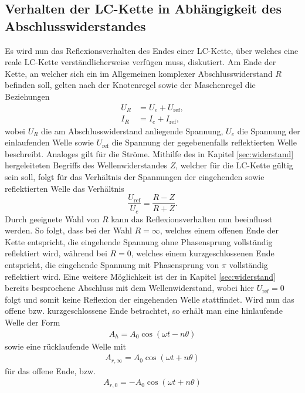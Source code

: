 \subsection{Verhalten der LC-Kette in Abhängigkeit des Abschlusswiderstandes}
\label{sec:verhalten}
Es wird nun das Reflexionsverhalten des Endes einer LC-Kette, über welches eine reale LC-Kette verständlicherweise verfügen muss, diskutiert.
Am Ende der Kette, an welcher sich ein im Allgemeinen komplexer Abschlusswiderstand $R$ befinden soll, gelten nach der Knotenregel sowie der Maschenregel die Beziehungen
\begin{align}
  U_R &= U_e + U_{\text{ref}}, \\
  I_R &= I_e + I_{\text{ref}},
\end{align}
wobei $U_R$ die am Abschlusswiderstand anliegende Spannung, $U_e$ die Spannung der einlaufenden Welle sowie $U_{\text{ref}}$ die Spannung der gegebenenfalls reflektierten Welle beschreibt.
Analoges gilt für die Ströme.
Mithilfe des in Kapitel \ref{sec:widerstand} hergeleiteten Begriffs des Wellenwiderstandes $Z$, welcher für die LC-Kette gültig sein soll, folgt für das Verhältnis der Spannungen der eingehenden sowie reflektierten Welle das Verhältnis
\begin{equation}
  \frac{U_{\text{ref}}}{U_e} = \frac{R - Z}{R + Z}.
\end{equation}
Durch geeignete Wahl von $R$ kann das Reflexionsverhalten nun beeinflusst werden.
So folgt, dass bei der Wahl $R=\infty$, welches einem offenen Ende der Kette entspricht, die eingehende Spannung ohne Phasensprung vollständig reflektiert wird, während bei $R=0$, welches einem kurzgeschlossenen Ende entspricht, die eingehende Spannung mit Phasensprung von $\pi$ vollständig reflektiert wird.
Eine weitere Möglichkeit ist der in Kapitel \ref{sec:widerstand} bereits besprochene Abschluss mit dem Wellenwiderstand, wobei hier $U_{\text{ref}} = 0$ folgt und somit keine Reflexion der eingehenden Welle stattfindet.
Wird nun das offene bzw. kurzgeschlossene Ende betrachtet, so erhält man eine hinlaufende Welle der Form
\begin{align*}
  A_h = A_0 \cos{(\omega t - n \theta)}
\end{align*}
sowie eine rücklaufende Welle mit
\begin{align*}
  A_{r, \infty} = A_0 \cos{(\omega t + n \theta)}
\end{align*}
für das offene Ende, bzw.
\begin{align*}
  A_{r, 0} = - A_0 \cos{(\omega t + n \theta)}
\end{align*}

